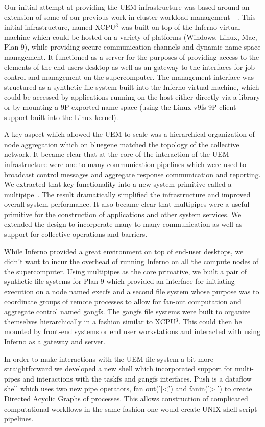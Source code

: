 Our initial attempt at providing the UEM infrastructure was based around an extension of 
some of our previous work in cluster workload management~\cite{xcpu}~\cite{xcpu2}.  This 
initial infrastructure, named XCPU$^3$ was built on top of the Inferno virtual machine which could be
hosted on a variety of platforms (Windows, Linux, Mac, Plan 9), while providing secure 
communication channels and dynamic name space management.  It functioned as a server
for the purposes of providing access to the elements of the end-users desktop as well
as an gateway to the interfaces for job control and management on the supercomputer.
The management interface was structured as a synthetic file system built into the 
Inferno virtual machine, which could be accessed by applications running on the host
either directly via a library or by mounting a 9P exported name space (using the Linux
v9fs 9P client support built into the Linux kernel).

A key aspect which allowed the UEM to scale was a hierarchical organization of node
aggregation which on bluegene matched the topology of the collective network.  It became
clear that at the core of the interaction of the UEM infrastructure were one to many
communication pipelines which were used to broadcast control messages and aggregate
response communication and reporting.  We extracted that key functionality into a new
system primitive called a multipipe~\cite{multipipe}.  The result dramatically simplified
the infrastructure and improved overall system performance.  It also became clear that
multipipes were a useful primitive for the construction of applications and other system
services.  We extended the design to incorperate many to many communication as well as
support for collective operations and barriers.

While Inferno provided a great environment on top of end-user desktops, we didn't want
to incur the overhead of running Inferno on all the compute nodes of the supercomputer.
Using multipipes as the core primative, we built a pair of synthetic file systems for 
Plan 9 which provided an interface for initiating execution on a node named execfs and
a second file system whose purpose was to coordinate groups of remote processes to allow
for fan-out computation and aggregate control named gangfs.  The gangfs file systems
were built to organize themselves hierarchically in a fashion similar to XCPU$^3$.  This
could then be mounted by front-end systems or end user workstations and interacted with
using Inferno as a gateway and server.

In order to make interactions with the UEM file system a bit more straightforward
we developed a new shell which incorporated support for multi-pipes and interactions
with the taskfs and gangfs interfaces.  
Push is a dataflow shell which uses two new pipe operators, fan out('|<') and 
fanin('>|') to create Directed Acyclic Graphs of processes.
This allows construction of complicated computational workflows 
in the same fashion one would create UNIX shell script pipelines.

